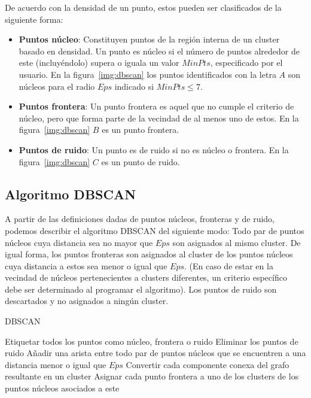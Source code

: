 De acuerdo con la densidad de un punto, estos pueden ser clasificados de la siguiente forma:

\begin{itemize}
    \item \textbf{Puntos núcleo}: Constituyen puntos de la región interna de un cluster basado en densidad.
    Un punto es núcleo si el número de puntos alrededor de este (incluyéndolo) supera o iguala un valor $MinPts$, especificado por el usuario.
    En la figura~\ref{img:dbscan} los puntos identificados con la letra $A$ son núcleos para el radio $Eps$ indicado si $MinPts\leq 7$.
    \item \textbf{Puntos frontera}: Un punto frontera es aquel que no cumple el criterio de núcleo, pero que forma parte de la vecindad de al menos uno de estos.
    En la figura~\ref{img:dbscan} $B$ es un punto frontera.
    \item \textbf{Puntos de ruido}: Un punto es de ruido si no es núcleo o frontera.
    En la figura~\ref{img:dbscan} $C$ es un punto de ruido.
\end{itemize}

\subsection{Algoritmo DBSCAN}\label{subsec:DBSCAN}

A partir de las definiciones dadas de puntos núcleos, fronteras y de ruido, podemos describir el algoritmo DBSCAN del siguiente modo: Todo par de puntos núcleos cuya distancia sea no mayor que $Eps$ son asignados al mismo cluster.
De igual forma, los puntos fronteras son asignados al cluster de los puntos núcleos cuya distancia a estos sea menor o igual que $Eps$.
(En caso de estar en la vecindad de núcleos pertenecientes a clusters diferentes, un criterio específico debe ser determinado al programar el algoritmo).
Los puntos de ruido son descartados y no asignados a ningún cluster.

\begin{algorithm}
    \caption{DBSCAN}
    \label{algorithm:DBSCAN}
    Etiquetar todos los puntos como núcleo, frontera o ruido\;
    Eliminar los puntos de ruido\;
    Añadir una arista entre todo par de puntos núcleos que se encuentren a una distancia menor o igual que $Eps$\;
    Convertir cada componente conexa del grafo resultante en un cluster\;
    Asignar cada punto frontera a uno de los clusters de los puntos núcleos asociados a este\;
\end{algorithm}

